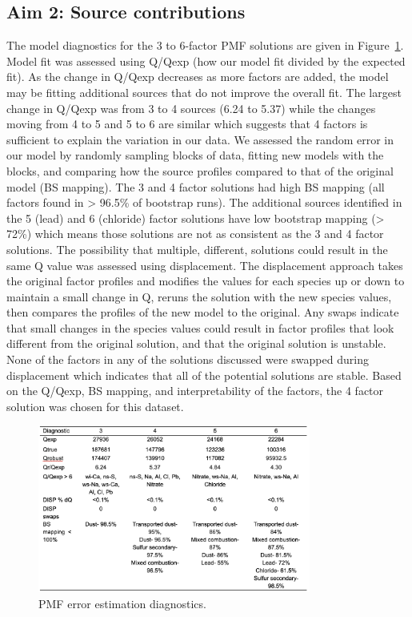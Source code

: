 \documentclass[
  letterpaper,
  DIV=11,
  numbers=noendperiod]{scrartcl}
\begin{document}
\hypertarget{aim-2-source-contributions}{%
\subsection{Aim 2: Source
contributions}\label{aim-2-source-contributions}}

The model diagnostics for the 3 to 6-factor PMF solutions are given in
Figure~\ref{fig-source-table}. Model fit was assessed using Q/Qexp (how
our model fit divided by the expected fit). As the change in Q/Qexp
decreases as more factors are added, the model may be fitting additional
sources that do not improve the overall fit. The largest change in
Q/Qexp was from 3 to 4 sources (6.24 to 5.37) while the changes moving
from 4 to 5 and 5 to 6 are similar which suggests that 4 factors is
sufficient to explain the variation in our data. We assessed the random
error in our model by randomly sampling blocks of data, fitting new
models with the blocks, and comparing how the source profiles compared
to that of the original model (BS mapping). The 3 and 4 factor solutions
had high BS mapping (all factors found in \textgreater{} 96.5\% of
bootstrap runs). The additional sources identified in the 5 (lead) and 6
(chloride) factor solutions have low bootstrap mapping (\textgreater{}
72\%) which means those solutions are not as consistent as the 3 and 4
factor solutions. The possibility that multiple, different, solutions
could result in the same Q value was assessed using displacement. The
displacement approach takes the original factor profiles and modifies
the values for each species up or down to maintain a small change in Q,
reruns the solution with the new species values, then compares the
profiles of the new model to the original. Any swaps indicate that small
changes in the species values could result in factor profiles that look
different from the original solution, and that the original solution is
unstable. None of the factors in any of the solutions discussed were
swapped during displacement which indicates that all of the potential
solutions are stable. Based on the Q/Qexp, BS mapping, and
interpretability of the factors, the 4 factor solution was chosen for
this dataset.

\begin{figure}[H]

{\centering \includegraphics[width=0.8\textwidth,height=\textheight]{images/source-table.png}

}

\caption{\label{fig-source-table}PMF error estimation diagnostics.}

\end{figure}
\end{document}
